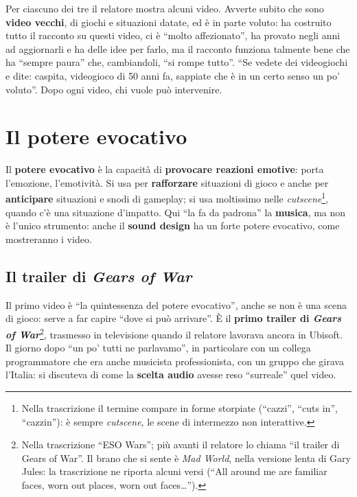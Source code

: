 Per ciascuno dei tre il relatore mostra alcuni video. Avverte subito che sono
\textbf{video vecchi}, di giochi e situazioni datate, ed è in parte voluto: ha
costruito tutto il racconto su questi video, ci è ``molto affezionato'', ha
provato negli anni ad aggiornarli e ha delle idee per farlo, ma il racconto
funziona talmente bene che ha ``sempre paura'' che, cambiandoli, ``si rompe
tutto''. ``Se vedete dei videogiochi e dite: caspita, videogioco di 50 anni fa,
sappiate che è in un certo senso un po' voluto''. Dopo ogni video, chi vuole può
intervenire.

\section{Il potere evocativo}
\label{z9:sec:evocativo}

Il \textbf{potere evocativo} è la capacità di \textbf{provocare reazioni
emotive}: porta l'emozione, l'emotività. Si usa per \textbf{rafforzare} situazioni
di gioco e anche per \textbf{anticipare} situazioni e snodi di gameplay; si usa
moltissimo nelle \emph{cutscene}\footnote{Nella trascrizione il termine compare
in forme storpiate (``cazzi'', ``cuts in'', ``cazzin''): è sempre
\emph{cutscene}, le scene di intermezzo non interattive.}, quando c'è una
situazione d'impatto. Qui ``la fa da padrona'' la \textbf{musica}, ma non è
l'unico strumento: anche il \textbf{sound design} ha un forte potere evocativo,
come mostreranno i video.

\subsection{Il trailer di \emph{Gears of War}}

Il primo video è ``la quintessenza del potere evocativo'', anche se non è una
scena di gioco: serve a far capire ``dove si può arrivare''. È il \textbf{primo
trailer di \emph{Gears of War}}\footnote{Nella trascrizione ``ESO Wars''; più
avanti il relatore lo chiama ``il trailer di Gears of War''. Il brano che si
sente è \emph{Mad World}, nella versione lenta di Gary Jules: la trascrizione ne
riporta alcuni versi (``All around me are familiar faces, worn out places, worn
out faces\ldots'').}, trasmesso in televisione quando il relatore lavorava ancora
in Ubisoft. Il giorno dopo ``un po' tutti ne parlavamo'', in particolare con un
collega programmatore che era anche musicista professionista, con un gruppo che
girava l'Italia: si discuteva di come la \textbf{scelta audio} avesse reso
``surreale'' quel video.

